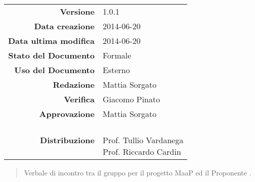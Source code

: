 
\newcommand{\Versione}{1.0.1}						%
\newcommand{\Data}{2014-06-20}						%
\newcommand{\DataUltimaModifica}{2014-06-20}
\newcommand{\TipoDocumento}{Verbale esterno 2014-06-20}		%




\begin{center}
\begin{tabular}{r|l}
\textbf{Versione} & \Versione{} \\
\textbf{Data creazione} & \Data{} \\
\textbf{Data ultima modifica} & \DataUltimaModifica{} \\
\textbf{Stato del Documento} & Formale \\		%
\textbf{Uso del Documento} & Esterno \\			%
\textbf{Redazione} & Mattia Sorgato \\				%
\textbf{Verifica} & Giacomo Pinato \\		%
\textbf{Approvazione} & Mattia Sorgato \\		%
\textbf{Distribuzione} & \parbox[t]{4cm}{\NomeGruppo{} \\Prof. Tullio Vardanega \\ Prof. Riccardo Cardin \\ \Prop{} }\\
\end{tabular}
\end{center}

\vspace{0.05in}

\begin{abstract}
\begin{center}
Verbale di incontro tra il gruppo \NomeGruppo{} per il progetto MaaP ed il Proponente \Prop{}.
\end{center}
\end{abstract}

